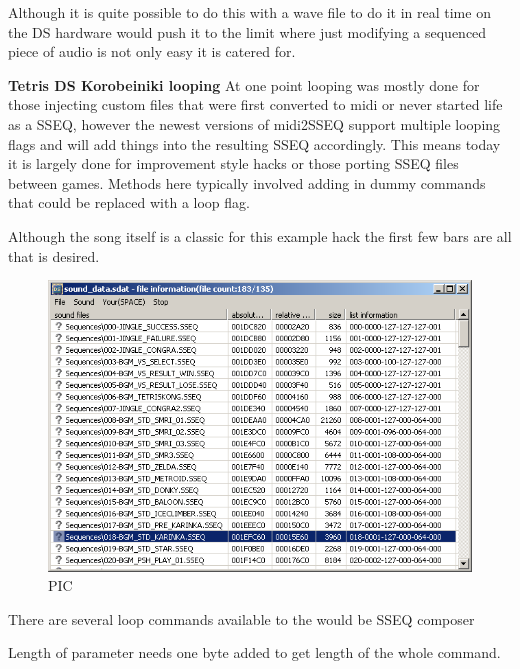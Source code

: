 \documentclass[
]{book}
\begin{document}
Although it is quite possible to do this with a wave file to do it in real time on the DS hardware would push it to the limit where just modifying a sequenced piece of audio is not only easy it is catered for.

\textbf{Tetris DS Korobeiniki looping} At one point looping was mostly done for those injecting custom files that were first converted to midi or never started life as a SSEQ, however the newest versions of midi2SSEQ support multiple looping flags and will add things into the resulting SSEQ accordingly. This means today it is largely done for improvement style hacks or those porting SSEQ files between games. Methods here typically involved adding in dummy commands that could be replaced with a loop flag.

Although the song itself is a classic for this example hack the first few bars are all that is desired.

\begin{figure}
\centering
\includegraphics{images/157_home_fast6191_romhackingguide_unrenamed_fil____original_borders_romhackguideSDATlooping_1.png}
\caption{PIC}
\end{figure}

There are several loop commands available to the would be SSEQ composer

Length of parameter needs one byte added to get length of the whole command.
\end{document}
